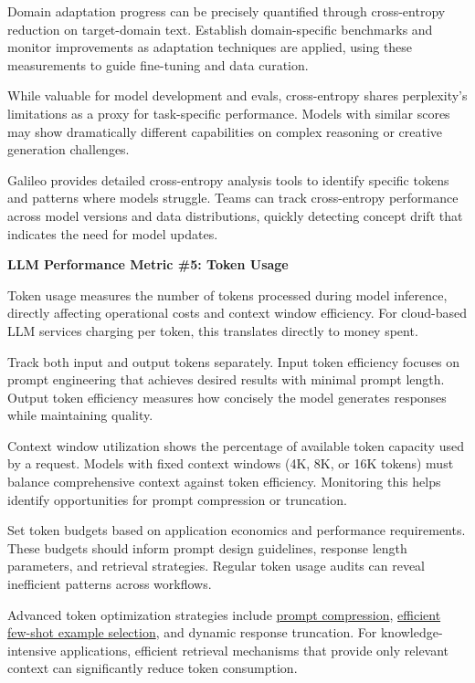 \documentclass[
  letterpaper,
  DIV=11,
  numbers=noendperiod,
  oneside]{scrreprt}
\begin{document}
\begin{tcolorbox}
Domain adaptation progress can be precisely quantified through
cross-entropy reduction on target-domain text. Establish domain-specific
benchmarks and monitor improvements as adaptation techniques are
applied, using these measurements to guide fine-tuning and data
curation.

While valuable for model development and evals, cross-entropy shares
perplexity's limitations as a proxy for task-specific performance.
Models with similar scores may show dramatically different capabilities
on complex reasoning or creative generation challenges.

Galileo provides detailed cross-entropy analysis tools to identify
specific tokens and patterns where models struggle. Teams can track
cross-entropy performance across model versions and data distributions,
quickly detecting concept drift that indicates the need for model
updates.

\textbf{LLM Performance Metric \#5: Token Usage}

Token usage measures the number of tokens processed during model
inference, directly affecting operational costs and context window
efficiency. For cloud-based LLM services charging per token, this
translates directly to money spent.

Track both input and output tokens separately. Input token efficiency
focuses on prompt engineering that achieves desired results with minimal
prompt length. Output token efficiency measures how concisely the model
generates responses while maintaining quality.

Context window utilization shows the percentage of available token
capacity used by a request. Models with fixed context windows (4K, 8K,
or 16K tokens) must balance comprehensive context against token
efficiency. Monitoring this helps identify opportunities for prompt
compression or truncation.

Set token budgets based on application economics and performance
requirements. These budgets should inform prompt design guidelines,
response length parameters, and retrieval strategies. Regular token
usage audits can reveal inefficient patterns across workflows.

Advanced token optimization strategies include
\href{https://arxiv.org/abs/2403.12968}{prompt compression},
\href{https://medium.com/@stefansipinkoski/optimizing-ai-agents-with-dynamic-few-shot-prompting-585919f694cc}{efficient
few-shot example selection}, and dynamic response truncation. For
knowledge-intensive applications, efficient retrieval mechanisms that
provide only relevant context can significantly reduce token
consumption.


\end{tcolorbox}
\end{document}
